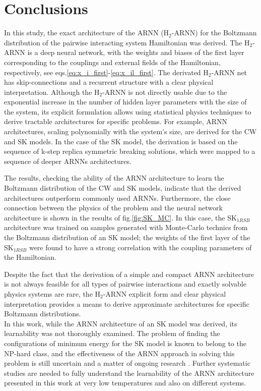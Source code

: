 \documentclass[aps,physrev,10pt,floatfix,reprint]{revtex4-2}
\begin{document}
\section{Conclusions}
In this study, the exact architecture of the ARNN (H$_2$-ARNN) for the Boltzmann distribution of the pairwise interacting system Hamiltonian was derived. The H$_2$-ARNN is a deep neural network, with the weights and biases of the first layer corresponding to the couplings and external fields of the Hamiltonian, respectively, see eqs.\ref{eq:x_i_first}-\ref{eq:x_il_first}. The derivated H$_2$-ARNN net has skip-connections and a recurrent structure with a clear physical interpretation. Although the H$_2$-ARNN is not directly usable due to the exponential increase in the number of hidden layer parameters with the size of the system, its explicit formulation allows using statistical physics techniques to derive tractable architectures for specific problems. For example, ARNN architectures, scaling polynomially with the system's size, are derived for the CW and SK models. In the case of the SK model, the derivation is based on the sequence of k-step replica symmetric breaking solutions, which were mapped to a sequence of deeper ARNNs architectures.

The results, checking the ability of the ARNN architecture to learn the Boltzmann distribution of the CW and SK models, indicate that the derived architectures outperform commonly used ARNNs. Furthermore, the close connection between the physics of the problem and the neural network architecture is shown in the results of fig.\ref{fig:SK_MC}. In this case, the  SK$_{1RSB}$ architecture was trained on samples generated with Monte-Carlo technics from the Boltzmann distribution of an SK model; the weights of the first layer of the SK$_{1RSB}$ were found to have a strong correlation with the coupling parameters of the Hamiltonian.

Despite the fact that the derivation of a simple and compact ARNN architecture is not always feasible for all types of pairwise interactions and exactly solvable physics systems are rare, the H$_2$-ARNN explicit form and clear physical interpretation provides a means to derive approximate architectures for specific Boltzmann distributions. \\
In this work, while the ARNN architecture of an SK model was derived, its learnability was not thoroughly examined. The problem of finding the configurations of minimum energy for the SK model is known to belong to the NP-hard class, and the effectiveness of the ARNN approach in solving this problem is still uncertain and a matter of ongoing research \cite{https://doi.org/10.48550/arxiv.2210.11145, 10.1038/s42256-021-00401-3, condmat7020038}. Further systematic studies are needed to fully understand the learnability of the ARNN architecture presented in this work at very low temperatures and also on different systems.\\
\end{document}
